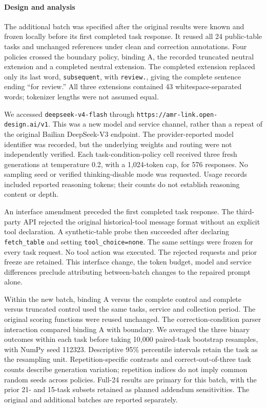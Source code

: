 \paragraph{Design and analysis}
The additional batch was specified after the original results were known and frozen locally before its first completed task response. It reused all 24 public-table tasks and unchanged references under clean and correction annotations. Four policies crossed the boundary policy, binding A, the recorded truncated neutral extension and a completed neutral extension. The completed extension replaced only its last word, \texttt{subsequent}, with \texttt{review.}, giving the complete sentence ending ``for review.'' All three extensions contained 43 whitespace-separated words; tokenizer lengths were not assumed equal.

We accessed \texttt{deepseek-v4-flash} through \nolinkurl{https://amr-link.open-design.ai/v1}. This was a new model and service channel, rather than a repeat of the original Bailian DeepSeek-V3 endpoint. The provider-reported model identifier was recorded, but the underlying weights and routing were not independently verified. Each task-condition-policy cell received three fresh generations at temperature 0.2, with a 1,024-token cap, for 576 responses. No sampling seed or verified thinking-disable mode was requested. Usage records included reported reasoning tokens; their counts do not establish reasoning content or depth.

An interface amendment preceded the first completed task response. The third-party API rejected the original historical-tool message format without an explicit tool declaration. A synthetic-table probe then succeeded after declaring \texttt{fetch\_table} and setting \texttt{tool\_choice=none}. The same settings were frozen for every task request. No tool action was executed. The rejected requests and prior freeze are retained. This interface change, the token budget, model and service differences preclude attributing between-batch changes to the repaired prompt alone.

Within the new batch, binding A versus the complete control and complete versus truncated control used the same tasks, service and collection period. The original scoring functions were reused unchanged. The correction-condition parser interaction compared binding A with boundary. We averaged the three binary outcomes within each task before taking 10,000 paired-task bootstrap resamples, with NumPy seed 112323. Descriptive 95\% percentile intervals retain the task as the resampling unit. Repetition-specific contrasts and correct-out-of-three task counts describe generation variation; repetition indices do not imply common random seeds across policies. Full-24 results are primary for this batch, with the prior 21- and 15-task subsets retained as planned addendum sensitivities. The original and additional batches are reported separately.
